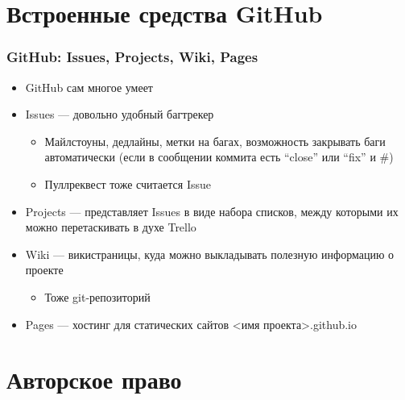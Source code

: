 \documentclass[xetex,mathserif,serif]{beamer}
\begin{document}
	\section{Встроенные средства GitHub}

	\begin{frame}
		\frametitle{GitHub: Issues, Projects, Wiki, Pages}
		\begin{itemize}
			\item GitHub сам многое умеет
			\item Issues --- довольно удобный багтрекер
			\begin{itemize}
				\item Майлстоуны, дедлайны, метки на багах, возможность закрывать баги автоматически (если в сообщении коммита есть ``close'' или ``fix'' и \#<номер бага>)
				\item Пуллреквест тоже считается Issue
			\end{itemize}
			\item Projects --- представляет Issues в виде набора списков, между которыми их можно перетаскивать в духе Trello
			\item Wiki --- викистраницы, куда можно выкладывать полезную информацию о проекте
			\begin{itemize}
				\item Тоже git-репозиторий
			\end{itemize}
			\item Pages --- хостинг для статических сайтов <имя проекта>.github.io
		\end{itemize}
	\end{frame}

	\section{Авторское право}
\end{document}
